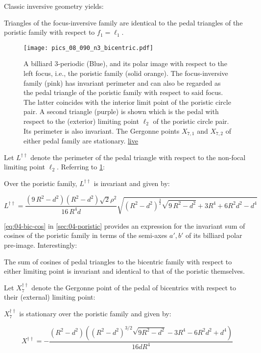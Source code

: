 Classic inversive geometry yields:

\begin{proposition}
Triangles of the focus-inversive family are identical to the pedal triangles of the poristic family with respect to $f_1=\ell_1$. 
\label{prop:08-focus-inversive-pedals}
\end{proposition}

\begin{figure}
    \centering
    \texttt{[image: pics\_08\_090\_n3\_bicentric.pdf]}
    \caption{A billiard 3-periodic (Blue), and its polar image with respect to the left focus, i.e., the poristic family (solid orange). The focus-inversive family (pink) has invariant perimeter and can also be regarded as the pedal triangle of the poristic family with respect to said focus. The latter coincides with the interior limit point of the poristic circle pair. A second  triangle (purple) is shown which is the pedal with respect to the (exterior) limiting point $\ell_2$ of the poristic circle pair. Its perimeter is also invariant. The Gergonne points $X_{7,1}$ and $X_{7,2}$ of either pedal family are stationary. \href{https://bit.ly/379HU8l}{live}}
    \label{fig:08-n3-bicentric-pedals}
\end{figure}

Let $L^{\dagger\dagger}$ denote the perimeter of the pedal triangle with respect to the non-focal limiting point $\ell_2$. Referring to \cref{fig:08-n3-bicentric-pedals}:

\begin{proposition}
Over the poristic family, 
 $L^{\dagger\dagger}$ is invariant and given by:

\[ L^{\dagger\dagger} = {\frac { \left( 9\,{R}^{2}-{d}^{2} \right)  \left( {R}^{2}-{d}^{2}
 \right) \sqrt {2}\rho^2}{16\,{R}^{4}d}\sqrt { \left( {R}^{2}-{d}^{2}
 \right) ^{{\frac{3}{2}}}\sqrt {9\,{R}^{2}-{d}^{2}}+ 3R^4 + 6R^2d^2 - d^4}}\]
\end{proposition}

\cref{eq:04-bic-cos} in  \cref{sec:04-poristic} provides an expression for the invariant sum of cosines of the poristic family in terms of the semi-axes $a',b'$ of its billiard polar pre-image. Interestingly:

\begin{proposition}
The sum of cosines of pedal triangles to the bicentric family with respect to either limiting point is invariant and identical to that of the poristic themselves.
\end{proposition}

Let $X_7^{\dagger\dagger}$ denote the Gergonne point of the pedal of bicentrics with respect to their (external) limiting point:

\begin{proposition}
$X_7^{\dagger\dagger}$ is stationary over the poristic family and given by:

\[X^{\dagger\dagger}=-\frac{(R^2  -d^2) ((R^2 - d^2)^{3/2}\sqrt{9R^2 - d^2} - 3R^4 - 6R^2d^2 + d^4)}{16d R^4}
\]
\end{proposition}


